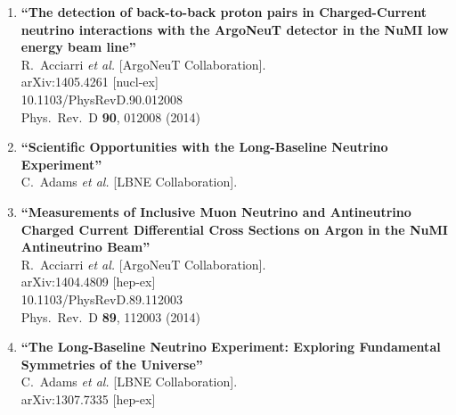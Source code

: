 \documentclass{res}
\begin{document}
\begin{resume}
\begin{enumerate}



\item%
{\bf ``The detection of back-to-back proton pairs in Charged-Current neutrino interactions with the ArgoNeuT detector in the NuMI low energy beam line''}
  \\{}R.~Acciarri {\it et al.}  [ArgoNeuT Collaboration].
  \\{}arXiv:1405.4261 [nucl-ex]
    \\{}10.1103/PhysRevD.90.012008
\\{}Phys.\ Rev.\ D {\bf 90}, 012008 (2014) %



\item%
{\bf ``Scientific Opportunities with the Long-Baseline Neutrino Experiment''}
  \\{}C.~Adams {\it et al.}  [LBNE Collaboration].
  


\item%
{\bf ``Measurements of Inclusive Muon Neutrino and Antineutrino Charged Current Differential Cross Sections on Argon in the NuMI Antineutrino Beam''}
  \\{}R.~Acciarri {\it et al.}  [ArgoNeuT Collaboration].
  \\{}arXiv:1404.4809 [hep-ex]
    \\{}10.1103/PhysRevD.89.112003
\\{}Phys.\ Rev.\ D {\bf 89}, 112003 (2014) %


\item%
{\bf ``The Long-Baseline Neutrino Experiment: Exploring Fundamental Symmetries of the Universe''}
  \\{}C.~Adams {\it et al.}  [LBNE Collaboration].
  \\{}arXiv:1307.7335 [hep-ex]
  



\end{enumerate}
\end{resume}
\end{document}
